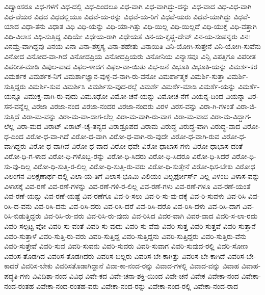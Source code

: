{ವಿದ್ವಾಂಸರೂ
ವಿಧ-ಗಳಗೆ
ವಿಧ-ದಲ್ಲಿ
ವಿಧ-ದಿಂದಲೂ
ವಿಧ-ವಾಗಿ
ವಿಧ-ವಾಗಿದ್ದು-ದನ್ನು
ವಿಧ-ವಾದ
ವಿಧ-ವಿಧ-ವಾಗಿ
ವಿಧ-ವೆಯರ
ವಿಧದ
ವಿಧದಲ್ಲಿಯೂ
ವಿಧವೆ-ಯ-ರನ್ನು
ವಿಧವೆ-ಯ-ರಿಗೆ
ವಿಧವೆ-ಯರು
ವಿಧವೆ-ಯಾಗಿದ್ದು
ವಿಧವೆ-ಯಾದ
ವಿಧಾ-ತನು
ವಿಧಾತ
ವಿಧಿ
ವಿಧಿ-ಯನ್ನು
ವಿಧಿ-ಯಾ-ಗಿತ್ತು
ವಿಧಿ-ಯಿಲ್ಲ
ವಿಧಿ-ಯಿಲ್ಲದೆ
ವಿಧಿ-ಯುಕ್ತ
ವಿಧಿ-ವತ್ತಾಗಿ
ವಿಧಿ-ವಿಲಾಸ
ವಿಧಿ-ಸುತ್ತಿದ್ದ
ವಿಧಿಯೇ
ವಿಧೇಯ-ರಾಗಿ
ವಿಧೇಯತೆ
ವಿನ-ಯ-ಕೃಷ್ಣ-ದೇವ್
ವಿನ-ಯ-ಸಂಪನ್ನರು
ವಿನಃ
ವಿನಮ್ರ-ವಾಗಿದ್ದವು
ವಿನಯ
ವಿನಾ
ವಿನಾ-ಶಸ್ತಸ್ಯ
ವಿನಾ-ಶಹೇತು
ವಿನಾಯಿತಿ
ವಿನಿ-ಯೋಗಿ-ಸುತ್ತೇನೆ
ವಿನಿ-ಯೋಗಿ-ಸುವೆನು
ವಿನೋದ
ವಿನೋದ-ವಾ-ಗಿದೆ
ವಿನೋದಪ್ರಿಯ
ವಿನೋದಪ್ರಿಯರು
ವಿನೋನಿಯ
ವಿನ್ಯಾಸವೂ
ವಿನ್ಸಿ
ವಿಪತ್ತಿಗೂ
ವಿಪರೀತ
ವಿಪರೀತ-ಮಾಡಿ
ವಿಪುಲ-ವಾದ
ವಿಫಲ-ಳಾದಗ
ವಿಫಲ-ವಾ-ಯಿತು
ವಿಭ-ಜನೆ
ವಿಭೂತಿ
ವಿಭೂತಿ-ಯನ್ನು
ವಿಮರ್ಶ-ಕರ
ವಿಮರ್ಶಕ
ವಿಮರ್ಶಕ-ನಿಗೆ
ವಿಮರ್ಶಾಜ್ಞಾನ-ವುಳ್ಳ-ವ-ನಾಗಿ-ರು-ವನೋ
ವಿಮರ್ಶಾತ್ಮಕ
ವಿಮರ್ಶಿ-ಸುತ್ತಾ
ವಿಮರ್ಶಿ-ಸುತ್ತಿದ್ದರು
ವಿಮರ್ಶಿ-ಸುವ
ವಿಮರ್ಶಿಸಿ
ವಿಮರ್ಶಿಸು-ವುದ-ರಲ್ಲೆ
ವಿಮರ್ಶೆ
ವಿಮರ್ಶೆ-ಮಾಡಿ
ವಿಮರ್ಶೆ-ಯನ್ನು
ವಿಮರ್ಶೆ-ಯನ್ನೂ
ವಿಮುಕ್ತ-ವಾಗಿ-ರು-ವುದು
ವಿಮೂಢೋ
ವಿಮೋ-ಚನೆ-ಯನ್ನು
ವಿಮೋಚ-ನೆಗೆ
ವಿಯನ್ನ-ದಿಂದ
ವಿಯನ್ನಾ
ವಿರ-ಸನ-ವನ್ನೆಲ್ಲ
ವಿರಜಾ
ವಿರಜಾ-ನಂದ
ವಿರಜಾ-ನಂದರ
ವಿರಜಾ-ನಂದರು
ವಿರಳ
ವಿರಸ-ವನ್ನು
ವಿರಾ-ಗಿ-ಗಳಂತೆ
ವಿರಾ-ಜಿ-ಸುತ್ತಿದೆ
ವಿರಾ-ಮ-ವನ್ನು
ವಿರಾ-ಮ-ವಾ-ದಾಗ-ಲೆಲ್ಲ
ವಿರಾ-ಮ-ವಾಗಿ-ರು-ವಾಗ
ವಿರಾ-ಮ-ವಾದ
ವಿರಾ-ಮ-ವಿದ್ದಾಗ-ಲೆಲ್ಲ
ವಿರಾ-ಮದ
ವಿರಾಟ್
ವಿರಾಟ್-ಚೈ-ತನ್ಯದ
ವಿರಾಡ್ರೂಪದ
ವಿರಾಮ
ವಿರುದ್ಧ
ವಿರುದ್ಧ-ವಾಗಿ
ವಿರುದ್ಧ-ವಾದ
ವಿರೋ-ಧ-ದಿಂದ
ವಿರೋ-ಧ-ವಾ-ಗಿದೆ
ವಿರೋ-ಧ-ವಾಗಿ
ವಿರೋ-ಧ-ವಾಗಿ-ರು-ವುದೇ
ವಿರೋ-ಧ-ವಾಗಿ-ರುವ
ವಿರೋ-ಧ-ವಾಗಿದ್ದರು
ವಿರೋ-ಧ-ವಾಗಿವೆ
ವಿರೋ-ಧ-ವಾದ
ವಿರೋ-ಧವೇ
ವಿರೋ-ಧಾಬಾಸ-ಗಳು
ವಿರೋ-ಧಾಭಾಸ-ದಂತೆ
ವಿರೋ-ಧಿ-ಗ-ಳಾದ
ವಿರೋ-ಧಿ-ಗಳೊಬ್ಬ-ರನ್ನು
ವಿರೋ-ಧಿ-ಸಿದರು
ವಿರೋ-ಧಿ-ಸಿದರೂ
ವಿರೋ-ಧಿ-ಸಿದರೆ
ವಿರೋ-ಧಿ-ಸು-ವು-ದಿಲ್ಲ
ವಿರೋ-ಧಿ-ಸುತ್ತಿ-ರ-ಲಿಲ್ಲ
ವಿರೋ-ಧಿ-ಸುತ್ತಿ-ರು-ವರು
ವಿರೋ-ಧಿ-ಸುತ್ತೇನೆ
ವಿರೋ-ಧಿಸ-ಬೇಕು
ವಿರೋಧ
ವಿಲಂಗನ
ವಿಲಕ್ಷಣಾರ್ಥ-ದಲ್ಲಿ
ವಿಲಾ-ಯ-ತಿಗೆ
ವಿಲಾಸ-ಭೂಮಿ
ವಿಲಿಯಂ
ವಿಲ್ಬರ್ಫೋರ್ಸ್
ವಿಲ್ಲ
ವಿಳಂಬ
ವಿಳಾಸ-ವನ್ನು
ವಿಳಾಸಕ್ಕೆ
ವಿವ-ರಣೆ
ವಿವ-ರಣೆ-ಗಳನ್ನು
ವಿವ-ರಣೆ-ಗಳಿ-ರ-ಲಿಲ್ಲ
ವಿವ-ರಣೆ-ಗಳು
ವಿವ-ರಣೆ-ಗಳೂ
ವಿವ-ರಣೆ-ಯಂತೆ
ವಿವ-ರಣೆ-ಯನ್ನು
ವಿವ-ರಣೆ-ಯಷ್ಟೆ
ವಿವ-ರಣೆಗೂ
ವಿವ-ರಿ-ಸಲು
ವಿವ-ರಿ-ಸು-ವು-ದಕ್ಕೆ
ವಿವ-ರಿ-ಸುವಳು
ವಿವ-ರಿಸಿ
ವಿವ-ರಿಸಿ-ದ-ವನು
ವಿವ-ರಿಸಿ-ದನು
ವಿವ-ರಿಸಿ-ದರು
ವಿವ-ರಿಸಿ-ದರೆ
ವಿವ-ರಿಸಿ-ದರೊ
ವಿವ-ರಿಸಿ-ದಳು
ವಿವ-ರಿಸಿ-ದಾಗ
ವಿವ-ರಿಸಿ-ಬಿಡುತ್ತಿದ್ದರು
ವಿವ-ರಿಸಿ-ರು-ವರು
ವಿವ-ರಿಸಿ-ರು-ವುದು
ವಿವ-ರಿಸಿದ
ವಿವರ-ವಾಗಿ
ವಿವರ-ವಾದ
ವಿವರಿ-ಸ-ಲಾ-ರದು
ವಿವರಿ-ಸಲ್ಪಟ್ಟ-ವೋ
ವಿವರಿ-ಸು-ವಂತೆ
ವಿವರಿ-ಸು-ವುದು
ವಿವರಿ-ಸು-ವೆವು
ವಿವರಿ-ಸುತ್ತ
ವಿವರಿ-ಸುತ್ತವೆ
ವಿವರಿ-ಸುತ್ತಾನೆ
ವಿವರಿ-ಸುತ್ತಾಳೆ
ವಿವರಿ-ಸುತ್ತಿ-ರು-ವರು
ವಿವರಿ-ಸುತ್ತಿದ್ದ
ವಿವರಿ-ಸುತ್ತಿದ್ದನು
ವಿವರಿ-ಸುತ್ತಿದ್ದರು
ವಿವರಿ-ಸುತ್ತಿರು-ವೆನು
ವಿವರಿ-ಸುತ್ತೇವೆ
ವಿವರಿ-ಸುವ
ವಿವರಿ-ಸುವನು
ವಿವರಿ-ಸುವರು
ವಿವರಿ-ಸುವಾಗ
ವಿವರಿ-ಸುವುದ-ರಲ್ಲಿ
ವಿವರಿ-ಸೋಣ
ವಿವರಿಸ-ತೊಡಗಿದ
ವಿವರಿಸ-ತೊಡಗಿದರು
ವಿವರಿಸ-ಬಲ್ಲರು
ವಿವರಿಸ-ಬೇ-ಕಾಗಿತ್ತು
ವಿವರಿಸ-ಬೇ-ಕಾಗಿದೆ
ವಿವರಿಸ-ಬೇ-ಕಾದರೆ
ವಿವರಿಸ-ಬೇಕು
ವಿವರಿಸತೊಡಾಗಿದ್ದಾನೆ
ವಿವಾ-ಕಾ-ನಂದ-ರನ್ನು
ವಿವಾದ-ಗಳಲ್ಲಿ
ವಿವಾದ-ವನ್ನು
ವಿವಾಹ
ವಿವಾಹ-ಪದ್ಧತಿ-ಗಳು
ವಿವಿದಿಶಾ-ನಂದ
ವಿವಿಧ
ವಿವೇ-ಕದ
ವಿವೇ-ಚನಾ-ಶಕ್ತಿ-ಯಿಂದ
ವಿವೇ-ಚನೆ
ವಿವೇಕ
ವಿವೇಕಾ-ನಂದ
ವಿವೇಕಾ-ನಂದ-ರಂತಹ
ವಿವೇಕಾ-ನಂದ-ರಂತಹ-ವರು
ವಿವೇಕಾ-ನಂದ-ರನ್ನು
ವಿವೇಕಾ-ನಂದ-ರಲ್ಲಿ
ವಿವೇಕಾ-ನಂದ-ರಾದ
}
